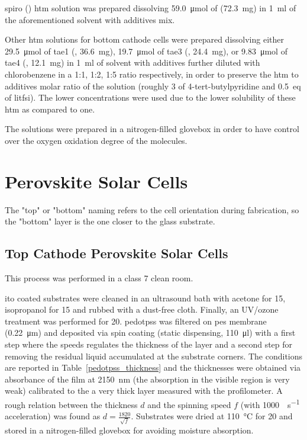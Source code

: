 		\Glsdesc{spiro} (\spiro) \gls{htm} solution was prepared dissolving \SI{59.0}{\umol} of \spiro (\SI{72.3}{\mg}) in \SI{1}{\ml} of the aforementioned solvent with additives mix.

		Other \gls{htm} solutions for bottom cathode cells were prepared dissolving either \SI{29.5}{\umol} of \glsdesc{tae1} (, \SI{36.6}{\mg}), \SI{19.7}{\umol} of \glsdesc{tae3} (, \SI{24.4}{\mg}), or \SI{9.83}{\umol} of \glsdesc{tae4} (, \SI{12.1}{\mg}) in \SI{1}{\ml} of solvent with additives further diluted with chlorobenzene in a 1:1, 1:2, 1:5 ratio respectively, in order to preserve the \gls{htm} to additives molar ratio of the \spiro solution (roughly \SI{3}{\eq} of 4-tert-butylpyridine and \SI{0.5}{eq} of \gls{litfsi}). The lower concentrations were used due to the lower solubility of these \gls{htm} as compared to \spiro one.

		The solutions were prepared in a nitrogen-filled glovebox in order to have control over the oxygen oxidation degree of the molecules.

\section{Perovskite Solar Cells}

	The "top" or "bottom" naming refers to the cell orientation during fabrication, so the "bottom" layer is the one closer to the glass substrate.

	\subsection{Top Cathode Perovskite Solar Cells}

			This process was performed in a class 7 clean room.

			\Gls{ito} coated substrates were cleaned in an ultrasound bath with acetone for \SI{15}{\min}, isopropanol for \SI{15}{\min} and rubbed with a dust-free cloth. Finally, an UV/ozone treatment was performed for \SI{20}{\min}.
			\Gls{pedotpss} was filtered on \gls{pes} membrane (\SI{0.22}{\um})
			and deposited via spin coating (static dispensing, \SI{110}{\ul}) with a first step where the speeds regulates the thickness of the layer and a second step for removing the residual liquid accumulated at the substrate corners. The conditions are reported in Table~\ref{pedotpss_thickness} and the thicknesses were obtained via absorbance of the film at \SI{2150}{\nm} (the absorption in the visible region is very weak) calibrated to the a very thick layer measured with the profilometer. A rough relation between the thickness $d$ and the spinning speed $f$ (with \SI{1000}{\rpm\per\s} acceleration) was found as $d = \frac{1820}{\sqrt{f}}$. Substrates were dried at \SI{110}{\celsius} for \SI{20}{\min} and stored in a nitrogen-filled glovebox for avoiding moisture absorption.

